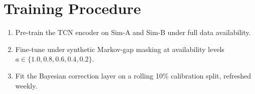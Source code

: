\section{Training Procedure}
\begin{enumerate}
  \item Pre-train the TCN encoder on Sim-A and Sim-B under full data availability.
  \item Fine-tune under synthetic Markov-gap masking at availability levels
        $a \in \{1.0, 0.8, 0.6, 0.4, 0.2\}$.
  \item Fit the Bayesian correction layer on a rolling 10\% calibration split, refreshed
        weekly.
\end{enumerate}

